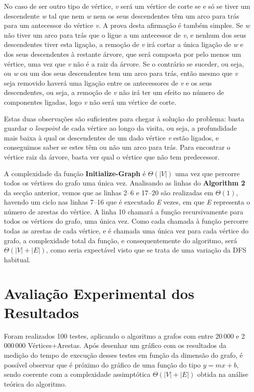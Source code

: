 \documentclass[12pt,a4paper,notitlepage]{article}
\begin{document}
No caso de ser outro tipo de vértice, \emph{v} será um vértice de corte se e só se tiver um descendente \emph{w} tal que nem \emph{w} nem os seus descendentes têm um arco para trás para um antecessor do vértice \emph{v}. 
A prova desta afirmação é também simples.
Se \emph{w} não tiver um arco para trás que o ligue a um antecessor de \emph{v}, e nenhum dos seus descendentes tiver esta ligação, a remoção de \emph{v} irá cortar a única ligação de \emph{w} e dos seus descendentes à restante árvore, que será composta por pelo menos um vértice, uma vez que \emph{v} não é a raiz da árvore.
Se o contrário se suceder, ou seja, ou \emph{w} ou um dos seus descendentes tem um arco para trás, então mesmo que \emph{v} seja removido haverá uma ligação entre os antecessores de \emph{v} e os seus descendentes, ou seja, a remoção de \emph{v} não irá ter um efeito no número de componentes ligadas, logo \emph{v} não será um vértice de corte.

Estas duas observações são suficientes para chegar à solução do problema: basta guardar o \emph{lowpoint} de cada vértice ao longo da visita, ou seja, a profundidade mais baixa à qual os descendentes de um dado vértice \emph{v} estão ligados, e conseguimos saber se estes têm ou não um arco para trás.
Para encontrar o vértice raiz da árvore, basta ver qual o vértice que não tem predecessor.

A complexidade da função \textbf{Initialize-Graph} é $\Theta(|V|)$ uma vez que percorre todos os vértices do grafo uma única vez.
Analisando as linhas do \textbf{Algorithm 2} da secção anterior, vemos que as linhas 2--6 e 17--20 são realizadas em $\Theta(1)$, havendo um ciclo nas linhas 7--16 que é executado \emph{E} vezes, em que \emph{E} representa o número de arestas do vértice.
A linha 10 chamará a função recursivamente para todos os vértices do grafo, uma única vez.
Como cada chamada à função percorre todas as arestas de cada vértice, e é chamada uma única vez para cada vértice do grafo, a complexidade total da função, e consequentemente do algoritmo, será $\Theta(|V|+|E|)$, como seria expectável visto que se trata de uma variação da DFS habitual.
\pagebreak

\section{Avaliação Experimental dos Resultados}

Foram realizados 100 testes, aplicando o algoritmo a grafos com entre 20\,000 e 2\,000\,000 Vértices$+$Arestas.
Após desenhar um gráfico com os resultados da medição do tempo de execução desses testes em função da dimensão do grafo, é possível observar que é próximo do gráfico  de uma função do tipo $y=mx+b$, sendo coerente com a complexidade assimptótica $\Theta(|V|+|E|)$ obtida na análise teórica do algoritmo.
\end{document}
